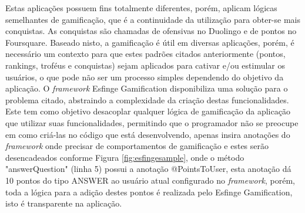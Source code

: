
\par Estas aplicações possuem fins totalmente diferentes, porém, aplicam lógicas semelhantes de gamificação, que é a continuidade da utilização para obter-se mais conquistas. As conquistas são chamadas de ofensivas no Duolingo e de pontos no Foursquare. Baseado nisto, a gamificação é útil em diversas aplicações, porém, é necessário um contexto para que estes padrões citados anteriormente (pontos, rankings, troféus e conquistas) sejam aplicados para cativar e/ou estimular os usuários, o que pode não ser um processo simples dependendo do objetivo da aplicação. O \textit{framework} Esfinge Gamification disponibiliza uma solução para o problema citado, abstraindo a complexidade da criação destas funcionalidades. Este tem como objetivo desacoplar qualquer lógica de gamificação da aplicação que utilizar suas funcionalidades, permitindo que o programador não se preocupe em como criá-las no código que está desenvolvendo, apenas insira anotações do \textit{framework} onde precisar de comportamentos de gamificação  e estes serão desencadeados conforme Figura \ref{fig:esfingesample}, onde o método "answerQuestion" (linha 5) possui a anotação @PointsToUser, esta anotação dá 10 pontos do tipo ANSWER ao usuário atual configurado no \textit{framework}, porém, toda a lógica para a adição destes pontos é realizada pelo Esfinge Gamification, isto é transparente na aplicação.

